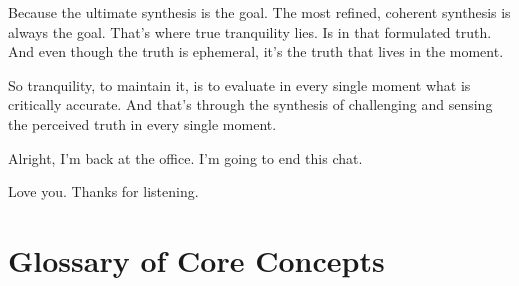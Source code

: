 \documentclass{article}
\newcommand{\docVersion}{\csTheSovereignandtheAdversaryVersion}
\begin{document}
Because the ultimate synthesis is the goal. The most refined, coherent synthesis is always the goal. That's where true tranquility lies. Is in that formulated truth. And even though the truth is ephemeral, it's the truth that lives in the moment. 

So tranquility, to maintain it, is to evaluate in every single moment what is critically accurate.
And that's through the synthesis of challenging and sensing the perceived truth in every single moment.

Alright, I'm back at the office. I'm going to end this chat.

Love you. Thanks for listening.





\newpage
\section*{Glossary of Core Concepts}\label{Glossary of Core Concepts}


\begin{description}



\end{description}



\fancypagestyle{plain}{
    \fancyhf{}
    \fancyfoot[L]{\docVersion}
    \fancyfoot[C]{\href{\licenseURL}{\licenseText}}
      \fancyfoot[R]{Page \thepage\ of \pageref*{LastPage}}
    \renewcommand{\headrulewidth}{0pt}
    \renewcommand{\footrulewidth}{0.4pt}
}


\printindex
\end{document}
